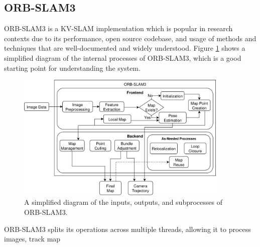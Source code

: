 \subsection{ORB-SLAM3}

ORB-SLAM3 is a KV-SLAM implementation which is popular in research contexts due to its performance, open source codebase, and usage of methods and techniques that are well-documented and widely understood. Figure \ref{fig:orb-slam3} shows a simplified diagram of the internal processes of ORB-SLAM3, which is a good starting point for understanding the system.

\begin{figure}[!ht]
    \centering
    \includegraphics[width=0.9\textwidth]{resources/orb-slam3.png}
    \caption[Simplified ORB-SLAM3 Operational Diagram]{A simplified diagram of the inputs, outputs, and subprocesses of ORB-SLAM3.}
    \label{fig:orb-slam3}
\end{figure}

ORB-SLAM3 splits its operations across multiple threads, allowing it to process images, track map